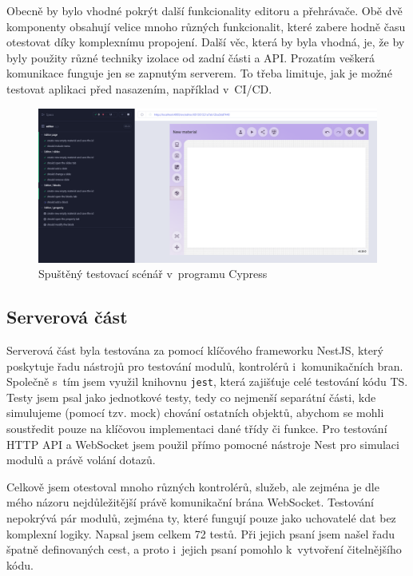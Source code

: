 Obecně by bylo vhodné pokrýt další funkcionality editoru a přehrávače. 
Obě dvě komponenty obsahují velice mnoho různých funkcionalit, které zabere hodně času otestovat díky komplexnímu propojení.
Další věc, která by byla vhodná, je, že by byly použity různé techniky izolace od zadní části a API.
Prozatím veškerá komunikace funguje jen se zapnutým serverem.
To třeba limituje, jak je možné testovat aplikaci před nasazením, například v~CI/CD.


\begin{figure}[ht!]
    \centering
    \includegraphics[width=1\textwidth]{media/06_testovani/e2e.png}
    \caption{Spuštěný testovací scénář v~programu Cypress}
    \label{fig:testovani/e2e}
\end{figure}


\subsection{Serverová část}

Serverová část byla testována za pomocí klíčového frameworku NestJS, který poskytuje řadu nástrojů pro testování modulů, kontrolérů i~komunikačních bran.
Společně s~tím jsem využil knihovnu \verb|jest|, která zajišťuje celé testování kódu TS.
Testy jsem psal jako jednotkové testy, tedy co nejmenší separátní části, kde simulujeme (pomocí tzv. mock) chování ostatních objektů, abychom se mohli soustředit pouze na klíčovou implementaci dané třídy či funkce.
Pro testování HTTP API a WebSocket jsem použil přímo pomocné nástroje Nest pro simulaci modulů a právě volání dotazů.

Celkově jsem otestoval mnoho různých kontrolérů, služeb, ale zejména je dle mého názoru nejdůležitější právě komunikační brána WebSocket.
Testování nepokrývá pár modulů, zejména ty, které fungují pouze jako uchovatelé dat bez komplexní logiky.
Napsal jsem celkem 72 testů.
Při jejich psaní jsem našel řadu špatně definovaných cest, a proto i~jejich psaní pomohlo k~vytvoření čitelnějšího kódu.

